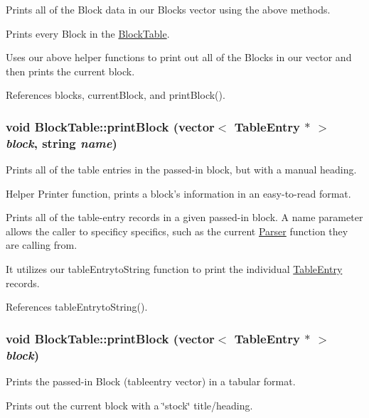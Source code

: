 Prints all of the Block data in our Blocks vector using the above methods. 

Prints every Block in the \hyperlink{classBlockTable}{BlockTable}.

Uses our above helper functions to print out all of the Blocks in our vector and then prints the current block. 

References blocks, currentBlock, and printBlock().

\hypertarget{classBlockTable_a7f4d48d59c7fab073a3b107a29d873a6}{
\subsubsection[{printBlock}]{\setlength{\rightskip}{0pt plus 5cm}void BlockTable::printBlock (vector$<$ {\bf TableEntry} $\ast$ $>$ {\em block}, \/  string {\em name})}}
\label{classBlockTable_a7f4d48d59c7fab073a3b107a29d873a6}


Prints all of the table entries in the passed-\/in block, but with a manual heading. 

Helper Printer function, prints a block's information in an easy-\/to-\/read format.

Prints all of the table-\/entry records in a given passed-\/in block. A name parameter allows the caller to specificy specifics, such as the current \hyperlink{classParser}{Parser} function they are calling from.

It utilizes our tableEntrytoString function to print the individual \hyperlink{structTableEntry}{TableEntry} records. 

References tableEntrytoString().

\hypertarget{classBlockTable_a06df0e10b6d3d810ee66e6f0a7373c6b}{
\subsubsection[{printBlock}]{\setlength{\rightskip}{0pt plus 5cm}void BlockTable::printBlock (vector$<$ {\bf TableEntry} $\ast$ $>$ {\em block})}}
\label{classBlockTable_a06df0e10b6d3d810ee66e6f0a7373c6b}


Prints the passed-\/in Block (tableentry vector) in a tabular format. 

Prints out the current block with a \char`\"{}stock\char`\"{} title/heading.

